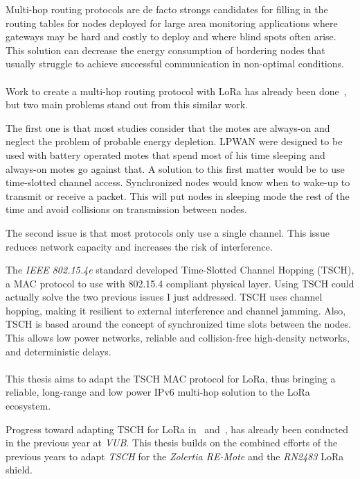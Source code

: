 Multi-hop routing protocols are de facto strongs candidates for filling in the
routing tables for nodes deployed for large area monitoring 
applications where gateways may be hard and costly to deploy and where blind
spots often arise.
This solution can decrease the energy consumption of bordering nodes that
usually struggle to achieve successful communication in non-optimal
conditions.

\paragraph{}

Work to create a multi-hop routing protocol with LoRa has already been
done~\cite{8115756, DIAS2018424, 8856256, Abrardo_2019, duong2018}, 
but two main problems stand out from this similar work.

The first one is that most studies consider that the motes are always-on and
neglect the problem of probable energy depletion. 
LPWAN were designed to be used with battery operated motes that spend most of
his time sleeping and always-on motes go against that.
A solution to this first matter would be to use time-slotted channel access.
Synchronized nodes would know when to wake-up to transmit or receive a packet.
This will put nodes in sleeping mode the rest of the time and avoid collisions
on transmission between nodes.

The second issue is that most protocols only use a single channel. 
This issue reduces network capacity and increases the risk of 
interference.

The \emph{IEEE 802.15.4e} standard developed Time-Slotted Channel Hopping
(TSCH), a MAC protocol to use with 802.15.4 compliant physical layer.
Using TSCH could actually solve the two previous issues I just addressed.
TSCH uses channel hopping, making it resilient to external interference and
channel jamming. 
Also, TSCH is based around the concept of synchronized time slots between the
nodes.
This allows low power networks, reliable and collision-free high-density
networks,
and deterministic delays.

\paragraph{}

This thesis aims to adapt the TSCH MAC protocol for LoRa,
thus bringing a reliable, long-range and low power IPv6 multi-hop
solution to the LoRa ecosystem.

Progress toward adapting TSCH for LoRa in~\cite{8847137} and~\cite{njomgang_2018}, 
has already been conducted in the previous year at \emph{VUB}.
This thesis builds on the combined efforts of the previous
years to adapt \emph{TSCH} for the \emph{Zolertia RE-Mote} and the
\emph{RN2483} LoRa shield.

